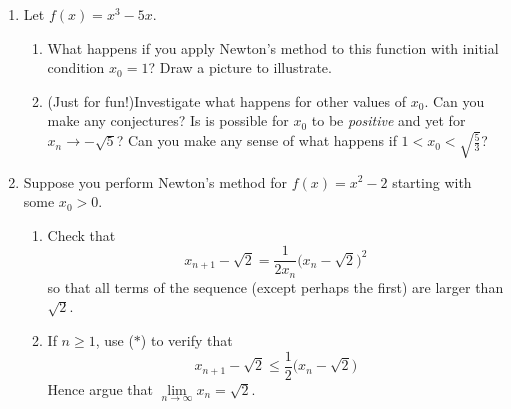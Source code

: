 \begin{exercises}{}{}
\begin{enumerate}
		
		\pagebreak[3]
	
	
  	\item\label{exs:newtonbad} Let $f(x)=x^3-5x$.
  	\begin{enumerate}
   		\item What happens if you apply Newton's method to this function with initial condition $x_0=1$? Draw a picture to illustrate.

    	\item (Just for fun!)\lstsp Investigate what happens for other values of $x_0$. Can you make any conjectures? Is is possible for $x_0$ to be \emph{positive} and yet for $x_n\to-\sqrt 5$? Can you make any sense of what happens if $1<x_0<\sqrt{\frac 53}$?
  	\end{enumerate}
   
 
  	\item\label{exs:newtonconverge} Suppose you perform Newton's method for $f(x)=x^2-2$ starting with some $x_0>0$.
  	\begin{enumerate}
  	  \item Check that
  	  \[
  	  	x_{n+1}-\sqrt 2=\frac 1{2x_n}\big(x_n-\sqrt 2\big)^2\tag{$\ast$}
  	  \]
  	  so that all terms of the sequence (except perhaps the first) are larger than $\sqrt 2$.
  	  \item If $n\ge 1$, use ($\ast$) to verify that
  	  \[
  	  	x_{n+1}-\sqrt 2	\le\frac 12\big(x_n-\sqrt 2\big)
  	  \]
  	  Hence argue that $\lim\limits_{n\to\infty}x_n=\sqrt 2$.
  	\end{enumerate}
	\end{enumerate}

\end{exercises}


